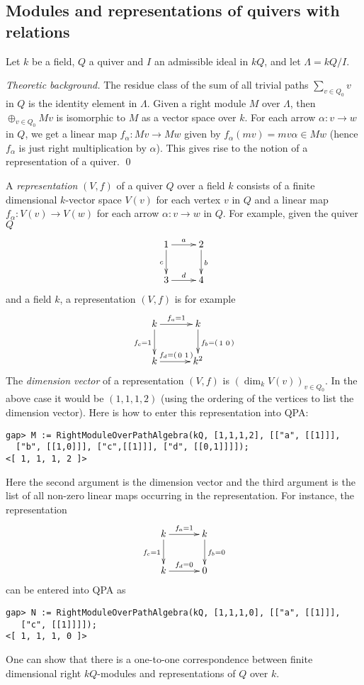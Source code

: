 \documentclass{amsart}
\renewcommand{\L}{\Lambda}
\theoremstyle{definition}
\theoremstyle{theoretic}
\newenvironment{theoback}
{\medskip\footnotesize\textit{Theoretic background.} }
{\qed\par\medskip}
\begin{document}
\subsection{Modules and representations of quivers with relations}

Let $k$ be a field, $Q$ a quiver and $I$ an admissible ideal in $kQ$,
and let $\L = kQ/I$.  

\begin{theoback}
The residue class of the sum of all trivial paths $\sum_{v\in Q_0} v$
in $Q$ is the identity element in $\L$.  Given a right module $M$ over
$\L$, then $\oplus_{v\in Q_0} Mv$ is isomorphic to $M$ as a vector
space over $k$.  For each arrow $\alpha\colon v\to w$ in $Q$, we get a
linear map $f_\alpha\colon Mv\to Mw$ given by $f_\alpha(mv) = mv\alpha
\in Mw$ (hence $f_\alpha$ is just right multiplication by $\alpha$).
This gives rise to the notion of a representation of a quiver.
\end{theoback}

A \emph{representation} $(V,f)$ of a quiver $Q$ over a field $k$
consists of a finite dimensional $k$-vector space $V(v)$ for each
vertex $v$ in $Q$ and a linear map $f_\alpha\colon V(v)\to V(w)$ for
each arrow $\alpha\colon v\to w$ in $Q$.  For example, given the
quiver $Q$
\[\xymatrix{
1\ar[r]^a\ar[d]_c & 2\ar[d]^b\\
3\ar[r]^d & 4
}\]
and a field $k$, a representation $(V,f)$ is for example 
\[\xymatrix@C=30pt{
k\ar[r]^{f_a = 1}\ar[d]_{f_c = 1} & k\ar[d]^{f_b
  = \left(\begin{smallmatrix} 1 & 0\end{smallmatrix}\right)}\\
k\ar[r]^{f_d = \left(\begin{smallmatrix} 0 & 1\end{smallmatrix}\right)} & k^2
}\]
The \emph{dimension vector} of a representation $(V,f)$ is $(\dim_k
V(v))_{v\in Q_0}$.  In the above case it would be $(1,1,1,2)$ (using
the ordering of the vertices to list the dimension vector).  Here is
how to enter this representation into QPA: 
\begin{verbatim}
gap> M := RightModuleOverPathAlgebra(kQ, [1,1,1,2], [["a", [[1]]], 
  ["b", [[1,0]]], ["c",[[1]]], ["d", [[0,1]]]]);
<[ 1, 1, 1, 2 ]>
\end{verbatim}
Here the second argument is the dimension vector and the third
argument is the list of all non-zero linear maps occurring in the
representation.  For instance, the representation 
\[\xymatrix@C=30pt{
k\ar[r]^{f_a = 1}\ar[d]_{f_c = 1} & k\ar[d]^{f_b  = 0}\\
k\ar[r]^{f_d = 0} & 0
}\]
can be entered into QPA as
\begin{verbatim}
gap> N := RightModuleOverPathAlgebra(kQ, [1,1,1,0], [["a", [[1]]], 
   ["c", [[1]]]]);
<[ 1, 1, 1, 0 ]>
\end{verbatim}
One can show that there is a one-to-one correspondence between finite
dimensional right $kQ$-modules and representations of $Q$ over $k$. 
\end{document}
